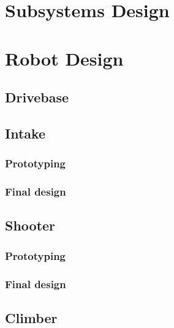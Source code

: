 

\newpage
\section{Subsystems Design}



\newpage
\section{Robot Design}


\newpage
\subsection{Drivebase}


\newpage
\subsection{Intake}

\subsubsection{Prototyping}


\subsubsection{Final design}


\newpage
\subsection{Shooter}
\subsubsection{Prototyping}


\subsubsection{Final design}


\newpage
\subsection{Climber}


